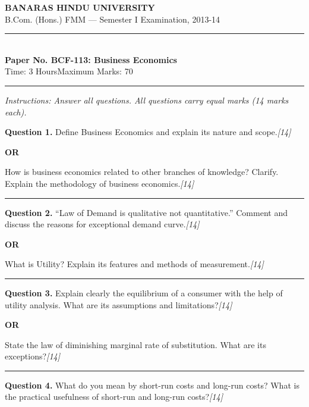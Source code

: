 \documentclass[11pt,a4paper]{article}
\newcommand{\pts}[1]{\hfill   \textit{[#1]}}
\begin{document}
\begin{center}
  {\large\bfseries BANARAS HINDU UNIVERSITY}\\[2pt]
  {\normalsize B.Com. (Hons.) FMM --- Semester I Examination, 2013-14}\\[6pt]
  \rule{0.8\linewidth}{0.5pt}\\[6pt]
  {\large\bfseries Paper No. BCF-113: Business Economics}\\[4pt]
  {\normalsize Time: 3 Hours\hfill Maximum Marks: 70}
\end{center}

\rule{\linewidth}{0.4pt}

\smallskip



\noindent   \textit{Instructions: Answer all questions. All questions carry equal marks (14 marks each).}

\bigskip




\noindent   \textbf{Question 1.}
Define Business Economics and explain its nature and scope.\pts{14}

\centerline{   \textbf{OR}}

How is business economics related to other branches of knowledge? Clarify. Explain the methodology of business economics.\pts{14}

\medskip\rule{\linewidth}{0.2pt}




\noindent   \textbf{Question 2.}
``Law of Demand is qualitative not quantitative.'' Comment and discuss the reasons for exceptional demand curve.\pts{14}

\centerline{   \textbf{OR}}

What is Utility? Explain its features and methods of measurement.\pts{14}

\medskip\rule{\linewidth}{0.2pt}




\noindent   \textbf{Question 3.}
Explain clearly the equilibrium of a consumer with the help of utility analysis. What are its assumptions and limitations?\pts{14}

\centerline{   \textbf{OR}}

State the law of diminishing marginal rate of substitution. What are its exceptions?\pts{14}

\medskip\rule{\linewidth}{0.2pt}




\noindent   \textbf{Question 4.}
What do you mean by short-run costs and long-run costs? What is the practical usefulness of short-run and long-run costs?\pts{14}
\end{document}
